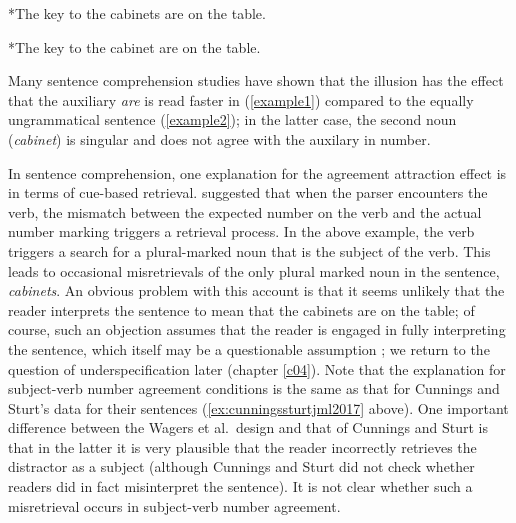 \documentclass{cambridge7A}\usepackage[]{graphicx}\usepackage[]{color}
\begin{document}
\begin{exe} 
\ex
\begin{xlist}
\item \label{example1}
*The key to the cabinets are on the table.
\item \label{example2}
*The key to the cabinet are on the table.
\end{xlist}
\end{exe}

Many sentence comprehension studies have shown that the illusion has the effect that the auxiliary \textit{are} is read faster in (\ref{example1}) compared to the equally ungrammatical sentence (\ref{example2}); in the latter case, the second noun (\textit{cabinet}) is singular and does not agree with the auxilary in number.

In sentence comprehension, one explanation for the  agreement attraction effect is in terms of  cue-based retrieval.  \cite{WagersLauPhillips2009} suggested that when the parser encounters the verb, the mismatch between the expected number on the verb and the actual number marking triggers a retrieval process. In the above example, the verb triggers a search for a plural-marked noun that is the subject of the verb. This leads to occasional misretrievals of the only plural marked noun in the sentence, \textit{cabinets}. An obvious problem with this account is that it seems unlikely that the reader interprets the sentence to mean that the cabinets are  on the table; of course, such an objection assumes that the reader is engaged in fully interpreting the sentence, which itself may be a questionable assumption \citep{SanfordSturt2002,FerreiraFerraroBailey2002}; we return to the question of  underspecification later (chapter \ref{c04}). Note that the explanation for subject-verb  number agreement conditions is the same as that for Cunnings and Sturt's  data for their  sentences (\ref{ex:cunningssturtjml2017} above). One important difference between the  Wagers et al.\  design and  that of Cunnings and Sturt  is that in the  latter it is very plausible that the reader incorrectly retrieves the distractor as a subject (although Cunnings and Sturt did not check whether readers did in fact misinterpret the sentence). It is not clear whether such a  misretrieval occurs in subject-verb number agreement.
  
\end{document}

